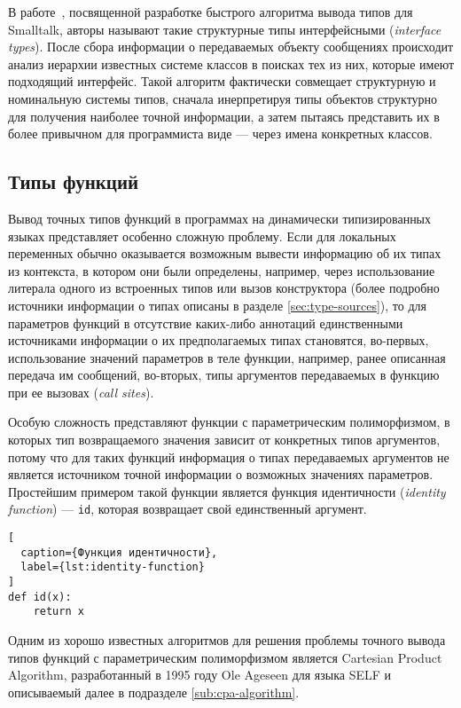 В работе~\cite{Pluquet2009}, посвященной разработке быстрого алгоритма вывода
типов для Smalltalk, авторы называют такие структурные типы интерфейсными
(\emph{interface types}). После сбора информации о передаваемых объекту
сообщениях происходит анализ иерархии известных системе классов в поисках тех из
них, которые имеют подходящий интерфейс. Такой алгоритм фактически совмещает
структурную и номинальную системы типов, сначала инерпретируя типы объектов
структурно для получения наиболее точной информации, а затем пытаясь представить
их в более привычном для программиста виде --- через имена конкретных классов.

\subsection{Типы функций} \label{sub:function-types}

Вывод точных типов функций в программах на динамически типизированных языках
представляет особенно сложную проблему. Если для локальных переменных обычно
оказывается возможным вывести информацию об их типах из контекста, в котором они
были определены, например, через использование литерала одного из встроенных
типов или вызов конструктора (более подробно источники информации о типах
описаны в разделе \ref{sec:type-sources}), то для параметров функций в
отсутствие каких-либо аннотаций единственными источниками информации о их
предполагаемых типах становятся, во-первых, использование значений параметров в
теле функции, например, ранее описанная передача им сообщений, во-вторых, типы
аргументов передаваемых в функцию при ее вызовах (\emph{call sites}).

Особую сложность представляют функции с параметрическим полиморфизмом, в
которых тип возвращаемого значения зависит от конкретных типов аргументов, 
потому что для таких функций информация о типах передаваемых аргументов не
является источником точной информации о возможных значениях параметров.
Простейшим примером такой функции является функция идентичности (\emph{identity
function}) --- \texttt{id}, которая возвращает свой единственный аргумент.

\begin{lstlisting}[
  caption={Функция идентичности},
  label={lst:identity-function}
]
def id(x):
    return x
\end{lstlisting}

Одним из хорошо известных алгоритмов для решения проблемы точного вывода типов
функций с параметрическим полиморфизмом является Cartesian Product Algorithm, 
разработанный в 1995 году Ole Ageseen для языка SELF и описываемый далее в
подразделе \ref{sub:cpa-algorithm}.

